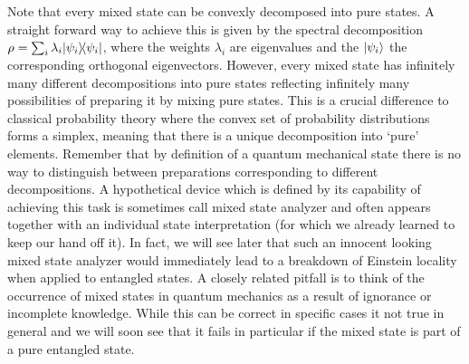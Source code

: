 \documentclass[11pt,a4paper]{article}
\theoremstyle{plain}
\theoremstyle{definition}
\theoremstyle{remark}
\numberwithin{equation}{section}
\begin{document}
Note that every mixed state can be convexly decomposed into pure states. A straight forward way to achieve this is given by the spectral decomposition $\rho=\sum_i \lambda_i |\psi_i\rangle\!\langle\psi_i|$, where the weights $\lambda_i$ are eigenvalues and the $|\psi_i\rangle$ the corresponding orthogonal eigenvectors. However, every mixed state has infinitely many different decompositions into pure states reflecting infinitely many possibilities of preparing it by mixing pure states. This is a crucial difference to classical probability theory where the convex set of probability distributions forms a simplex, meaning that there is a unique decomposition into `pure' elements. Remember that by definition of a quantum mechanical state there is no way to distinguish between preparations corresponding to different decompositions. A hypothetical device which is defined by its capability of achieving this task is sometimes call mixed state analyzer and often appears together with an individual state interpretation (for which we already learned to keep our hand off it). In fact, we will see later that such an innocent looking mixed state analyzer would immediately lead to a breakdown of Einstein locality when applied to entangled states. A closely related pitfall is to think of the occurrence of mixed states in quantum mechanics as a result of ignorance or incomplete knowledge. While this can be correct in specific cases it not true in general and we will soon see that it fails in particular if the mixed state is part of a pure entangled state.
\end{document}
